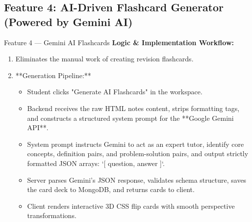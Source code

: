 \documentclass[12pt,a4paper]{article}
\begin{document}
\subsection{Feature 4: AI-Driven Flashcard Generator (Powered by Gemini AI)}
\begin{featurebox}{Feature 4 --- Gemini AI Flashcards}
\textbf{Logic \& Implementation Workflow:} 
\begin{enumerate}[leftmargin=1.2cm]
    \item Eliminates the manual work of creating revision flashcards.
    \item **Generation Pipeline:**
    \begin{itemize}
        \item Student clicks "Generate AI Flashcards" in the workspace.
        \item Backend receives the raw HTML notes content, strips formatting tags, and constructs a structured system prompt for the **Google Gemini API**.
        \item System prompt instructs Gemini to act as an expert tutor, identify core concepts, definition pairs, and problem-solution pairs, and output strictly formatted JSON arrays: `[{ question, answer }]`.
        \item Server parses Gemini's JSON response, validates schema structure, saves the card deck to MongoDB, and returns cards to client.
        \item Client renders interactive 3D CSS flip cards with smooth perspective transformations.
    \end{itemize}
\end{enumerate}
\end{featurebox}
\end{document}
